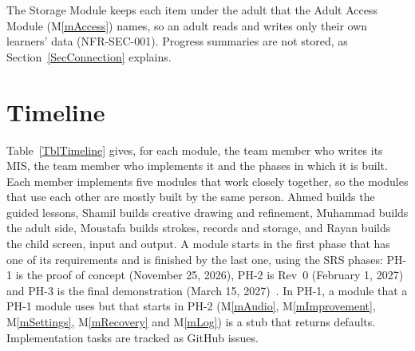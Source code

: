 \documentclass[12pt, titlepage]{article}
\newcommand{\mref}[1]{M\ref{#1}}
\begin{document}
The Storage Module keeps each item under the adult that the Adult Access
Module (\mref{mAccess}) names, so an adult reads and writes only their own
learners' data (NFR-SEC-001). Progress summaries are not stored, as
Section~\ref{SecConnection} explains.

\section{Timeline} \label{SecTimeline}

Table~\ref{TblTimeline} gives, for each module, the team member who writes its
MIS, the team member who implements it and the phases in which it is built.
Each member implements five modules that work closely together, so the modules
that use each other are mostly built by the same person. Ahmed builds the
guided lessons, Shamil builds creative drawing and refinement, Muhammad builds
the adult side, Moustafa builds strokes, records and storage, and Rayan builds
the child screen, input and output. A module starts in the first phase that
has one of its requirements and is finished by the last one, using the SRS
phases: PH-1 is the proof of concept (November 25, 2026), PH-2 is Rev~0
(February 1, 2027) and PH-3 is the final demonstration (March 15,
2027)~\citep{SRS}. In PH-1, a module that a PH-1 module uses but that starts in
PH-2 (\mref{mAudio}, \mref{mImprovement}, \mref{mSettings}, \mref{mRecovery} and
\mref{mLog}) is a stub that returns defaults. Implementation tasks are tracked
as GitHub issues.
\end{document}
